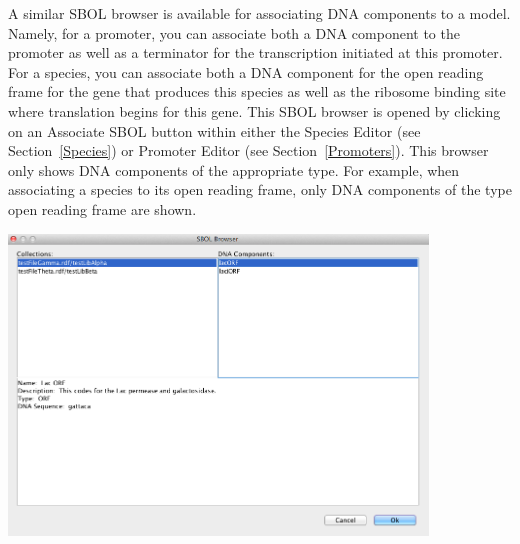 \documentclass[titlepage,11pt]{article}
\begin{document}
A similar SBOL browser is available for associating DNA components to a model.  Namely, for a promoter, you can associate both a DNA component to the promoter as well as a terminator for the transcription initiated at this promoter.  For a species, you can associate both a DNA component for the open reading frame for the gene that produces this species as well as the ribosome binding site where translation begins for this gene.  This SBOL browser is opened by clicking on an Associate SBOL button within either the Species Editor (see Section~\ref{Species}) or Promoter Editor (see Section~\ref{Promoters}).  This browser only shows DNA components of the appropriate type.  For example, when associating a species to its open reading frame, only DNA components of the type open reading frame are shown.

\begin{center}
\includegraphics[height=80mm]{screenshots/AssociateSBOL}
\end{center}






\end{document}
